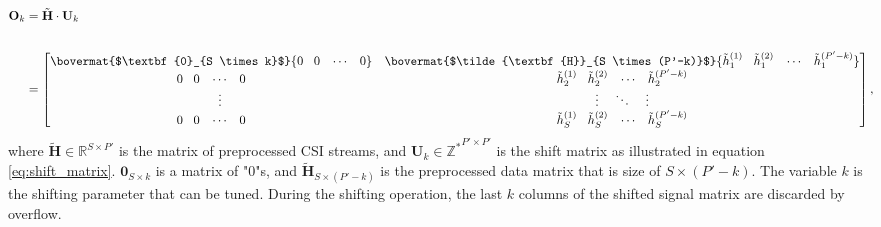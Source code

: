 \begin{align}
\textbf{O}_{k}&=\tilde{\textbf{H}}\cdot \textbf{U}_{k}\\[1.8em]
&=
\begin{bmatrix}
\bovermat{$\textbf{0}_{S \times k}$}{\vspace{0.2cm}0 \hspace{0.3cm} 0\hspace{0.3cm}\cdots \hspace{0.3cm}0}&\bovermat{$\tilde{\textbf{H}}_{S \times (P'-k)}$}{\vspace{0.2cm}\tilde{h}^{(1)}_{1} \hspace{0.3cm} \tilde{h}^{(2)}_{1} \hspace{0.3cm} \cdots \hspace{0.3cm} \tilde{h}^{(P'-k)}_{1}}\\%
%
{0 \hspace{0.3cm} 0\hspace{0.3cm}\cdots \hspace{0.3cm}0}&{\tilde{h}^{(1)}_{2} \hspace{0.3cm} \tilde{h}^{(2)}_{2} \hspace{0.3cm} \cdots \hspace{0.3cm} \tilde{h}^{(P'-k)}_{2}}\\
%
\hspace{0.5cm} \vdots&\vdots \hspace{0.4cm} \ddots \hspace{0.4cm}\vdots\\
%
{0 \hspace{0.3cm} 0\hspace{0.3cm}\cdots \hspace{0.3cm}0}&{\tilde{h}^{(1)}_{S} \hspace{0.3cm} \tilde{h}^{(2)}_{S} \hspace{0.3cm} \cdots \hspace{0.3cm} \tilde{h}^{(P'-k)}_{S}}\nonumber
\end{bmatrix},\!\!\!
%
\end{align}
where $\tilde{\textbf{H}}\in \mathbb{R}^{S\times P'}$ is the matrix of preprocessed CSI streams, and $\textbf{U}_{k}\in\mathbb{Z^{*}}^{P' \times P'}$ is the shift matrix as illustrated in equation \ref{eq:shift_matrix}. $\textbf{0}_{S \times k}$ is a matrix of "0"s, and $\tilde{\textbf{H}}_{S \times (P'-k)}$ is the preprocessed data matrix that is size of ${S \times (P'-k)}$. The variable $k$ is the shifting parameter that can be tuned. During the shifting operation, the last $k$ columns of the shifted signal matrix are discarded by overflow.
